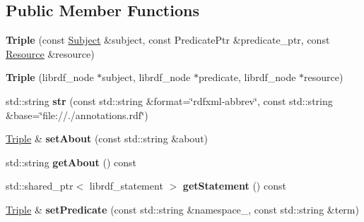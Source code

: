 \subsection*{Public Member Functions}
\begin{DoxyCompactItemize}
\item 
\mbox{\label{classsemsim_1_1Triple_a2d73ce89601f4ff3df0abe8c9646876c}} 
{\bfseries Triple} (const \hyperlink{classsemsim_1_1Subject}{Subject} \&subject, const Predicate\+Ptr \&predicate\+\_\+ptr, const \hyperlink{classsemsim_1_1Resource}{Resource} \&resource)
\item 
\mbox{\label{classsemsim_1_1Triple_a633f2253a4ea8689721aeeb0929a4e26}} 
{\bfseries Triple} (librdf\+\_\+node $\ast$subject, librdf\+\_\+node $\ast$predicate, librdf\+\_\+node $\ast$resource)
\item 
\mbox{\label{classsemsim_1_1Triple_a20ba537cd620f4fec9bc56eb29662d23}} 
std\+::string {\bfseries str} (const std\+::string \&format=\char`\"{}rdfxml-\/abbrev\char`\"{}, const std\+::string \&base=\char`\"{}file\+://./annotations.\+rdf\char`\"{})
\item 
\mbox{\label{classsemsim_1_1Triple_ad2b2ab0b15a970f5dc95a25e1ec61f1f}} 
\hyperlink{classsemsim_1_1Triple}{Triple} \& {\bfseries set\+About} (const std\+::string \&about)
\item 
\mbox{\label{classsemsim_1_1Triple_a972f806fbf6e71f60f6b6b7ba433c79c}} 
std\+::string {\bfseries get\+About} () const
\item 
\mbox{\label{classsemsim_1_1Triple_a12bbba125df06854a1954ccff5be72e9}} 
std\+::shared\+\_\+ptr$<$ librdf\+\_\+statement $>$ {\bfseries get\+Statement} () const
\item 
\mbox{\label{classsemsim_1_1Triple_af39ecc1713db90ccfbad436eb52fe900}} 
\hyperlink{classsemsim_1_1Triple}{Triple} \& {\bfseries set\+Predicate} (const std\+::string \&namespace\+\_\+, const std\+::string \&term)
\item 
\mbox{\label{classsemsim_1_1Triple_ad85dc3e3538da54fb96387a3135b8f78}} 

\end{DoxyCompactItemize}
